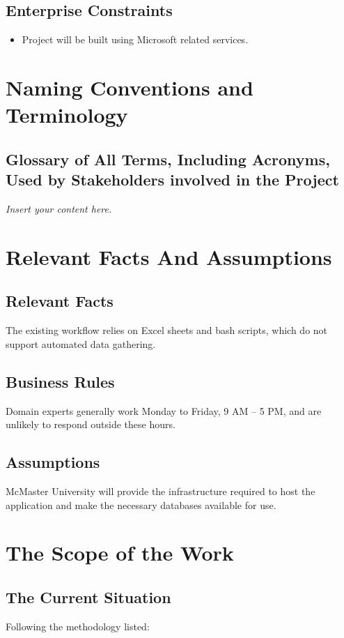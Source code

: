 \documentclass[12pt]{article}
\newcommand{\lips}{\textit{Insert your content here.}}
\begin{document}
\subsection{Enterprise Constraints}
\begin{itemize}
  \item Project will be built using Microsoft related services.
\end{itemize}

\section{Naming Conventions and Terminology}
\subsection{Glossary of All Terms, Including Acronyms, Used by Stakeholders
involved in the Project}
\lips

\section{Relevant Facts And Assumptions}
\subsection{Relevant Facts}
The existing workflow relies on Excel sheets and bash scripts, which do not support automated data gathering.
\subsection{Business Rules}
Domain experts generally work Monday to Friday, 9 AM – 5 PM, and are unlikely to respond outside these hours.
\subsection{Assumptions}
McMaster University will provide the infrastructure required to host the application and make the necessary databases available for use.

\section{The Scope of the Work}
\subsection{The Current Situation}
Following the methodology listed:
\end{document}
